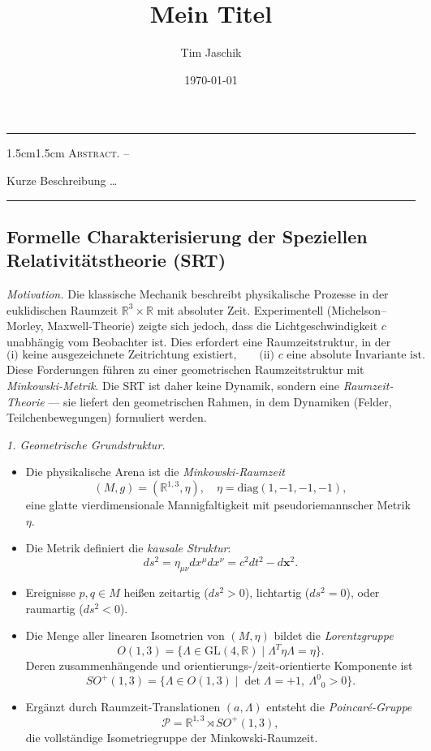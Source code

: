 \documentclass[10pt, letterpaper]{article}
\title{Mein Titel}
\author{Tim Jaschik}
\date{\today}
\newcommand{\R}{\mathbb{R}}
\renewenvironment{abstract}
  {
    \begin{adjustwidth}{1.5cm}{1.5cm}
    \small
    \textsc{Abstract. –}%
  }
  {
    \end{adjustwidth}
  }
\begin{document}
\maketitle
\rule{\textwidth}{0.5pt}
\begin{abstract}
Kurze Beschreibung …
\end{abstract}
\rule{\textwidth}{0.5pt}
\vspace{0.5cm}

\tableofcontents

\pagebreak

\subsection{Formelle Charakterisierung der Speziellen Relativitätstheorie (SRT)}

\emph{Motivation.}
Die klassische Mechanik beschreibt physikalische Prozesse in der euklidischen Raumzeit
$\R^3\times\R$ mit absoluter Zeit.  
Experimentell (Michelson–Morley, Maxwell-Theorie) zeigte sich jedoch, 
dass die Lichtgeschwindigkeit $c$ unabhängig vom Beobachter ist.  
Dies erfordert eine Raumzeitstruktur, in der
\[
\text{(i) keine ausgezeichnete Zeitrichtung existiert,}\qquad
\text{(ii) $c$ eine absolute Invariante ist.}
\]
Diese Forderungen führen zu einer geometrischen Raumzeitstruktur mit \emph{Minkowski-Metrik}.
Die SRT ist daher keine Dynamik, sondern eine \emph{Raumzeit-Theorie} —  
sie liefert den geometrischen Rahmen, in dem Dynamiken (Felder, Teilchenbewegungen) 
formuliert werden.

\bigskip
\emph{1. Geometrische Grundstruktur.}
\begin{itemize}
\item Die physikalische Arena ist die \emph{Minkowski-Raumzeit}
\[
(M,g) = (\R^{1,3}, \eta),
\quad
\eta = \mathrm{diag}(1,-1,-1,-1),
\]
eine glatte vierdimensionale Mannigfaltigkeit mit pseudo\-riemann\-scher Metrik $\eta$.
\item Die Metrik definiert die \emph{kausale Struktur}:
\[
ds^2 = \eta_{\mu\nu}dx^\mu dx^\nu
=
c^2dt^2 - d\mathbf{x}^2.
\]
\item Ereignisse $p,q\in M$ heißen
zeitartig ($ds^2>0$), lichtartig ($ds^2=0$), oder raumartig ($ds^2<0$).
\item Die Menge aller linearen Isometrien von $(M,\eta)$ bildet die \emph{Lorentzgruppe}
\[
O(1,3)
= \{\Lambda\in \mathrm{GL}(4,\R)\mid \Lambda^T\eta\Lambda = \eta\}.
\]
Deren zusammenhängende und orientierungs-/zeit-orientierte Komponente ist
\[
SO^+(1,3) = \{\Lambda\in O(1,3)\mid \det\Lambda=+1,\ \Lambda^0{}_0>0\}.
\]
\item Ergänzt durch Raumzeit-Translationen $(a,\Lambda)$ entsteht die \emph{Poincaré-Gruppe}
\[
\mathcal P = \R^{1,3}\rtimes SO^+(1,3),
\]
die vollständige Isometriegruppe der Minkowski-Raumzeit.
\end{itemize}
\end{document}
